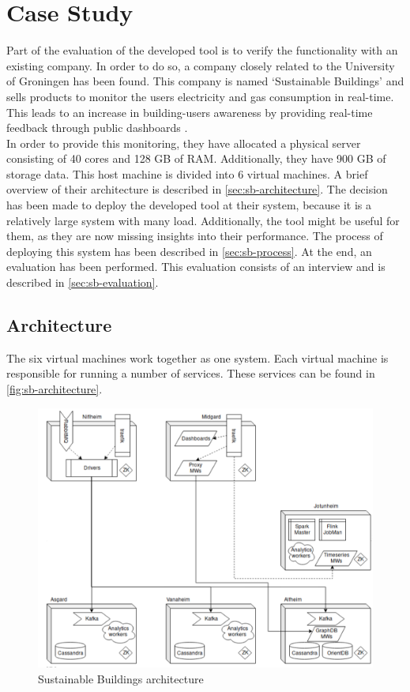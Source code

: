 \chapter{Case Study}\label{ch:evaluation}
Part of the evaluation of the developed tool is to verify the functionality with an existing company. In order to do so, a company closely related to the University of Groningen has been found. This company is named `Sustainable Buildings' and sells products to monitor the users electricity and gas consumption in real-time. This leads to an increase in building-users awareness by providing real-time feedback through public dashboards \cite{sb}.\\

\noindent
In order to provide this monitoring, they have allocated a physical server consisting of 40 cores and 128 GB of RAM. Additionally, they have 900 GB of storage data. This host machine is divided into 6 virtual machines. A brief overview of their architecture is described in \autoref{sec:sb-architecture}. The decision has been made to deploy the developed tool at their system, because it is a relatively large system with many load. Additionally, the tool might be useful for them, as they are now missing insights into their performance. The process of deploying this system has been described in \autoref{sec:sb-process}. At the end, an evaluation has been performed. This evaluation consists of an interview and is described in \autoref{sec:sb-evaluation}.

\section{Architecture} \label{sec:sb-architecture}
The six virtual machines work together as one system. Each virtual machine is responsible for running a number of services. These services can be found in \autoref{fig:sb-architecture}.

\begin{figure}
    \centering
    \includegraphics[width=\textwidth]{gfx/sb-architecture.png}
    \caption{Sustainable Buildings architecture}
    \label{fig:sb-architecture}
\end{figure}

